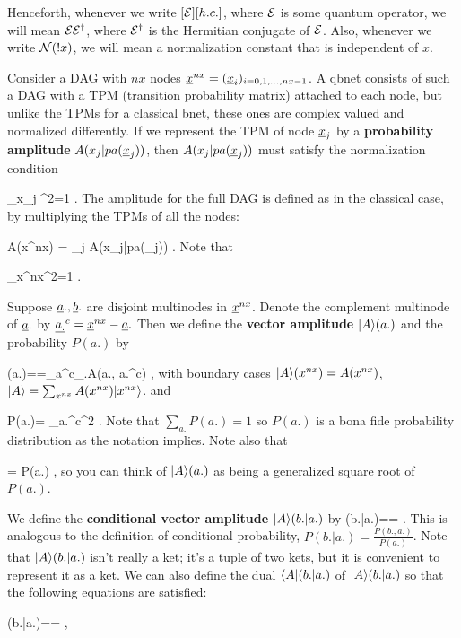 \documentclass[12pt]{article}
\begin{document}
Henceforth,
whenever
we write
$[{\cal E}][h.c.]$,
where ${\cal E}$
is some quantum operator,
we will mean ${\cal E}{\cal E}^\dag$,
where ${\cal E}^\dag$
is the Hermitian conjugate
of ${\cal E}$.
Also, whenever
we write
${\cal N}(!x)$,
we will
mean a 
normalization
constant that is independent
of $x$.

Consider
a DAG with $nx$ nodes
${\underline{x}}^{nx}= ({\underline{x}}_i)_{i=0, 1, \ldots, nx-1}$.
A qbnet 
consists of such a DAG with 
a TPM (transition probability matrix)
attached to each node,
but unlike the TPMs for a classical bnet,
these ones are complex valued
and normalized differently.
If we represent the TPM
of node ${\underline{x}}_j$
by a {\bf probability 
amplitude} $A(x_j|pa({\underline{x}}_j))$,
then $A(x_j|pa({\underline{x}}_j))$ must satisfy
the normalization condition

\beq
\sum_{x_j}
^2=1
\;.
\eeq
The amplitude for the full
DAG is defined as in the classical
case, by multiplying
the TPMs of all the nodes:

\beq
A(x^{nx})
=
\prod_j A(x_j|pa(\rvx_j))
\;.
\eeq
Note that

\beq
\sum_{x^{nx}}^2=1
\;.
\eeq

Suppose
${\underline{a}}., {\underline{b}}.$ are disjoint multinodes 
in ${\underline{x}}^{nx}$. Denote
the complement
multinode of ${\underline{a}}.$ by
$\underline{a_.}^c={\underline{x}}^{nx}-{\underline{a}}.$ Then
we define
the {\bf vector amplitude} $|A\rangle(a.)$ 
and the probability $P(a.)$ by


\beq 
\A(a.)==\sum_{a^c_.}A(a., a.^c)
\;,
\eeq
with boundary cases
$|A\rangle(x^{nx})=A(x^{nx})$,\;
$|A\rangle=\sum_{x^{nx}}A(x^{nx})|x^{nx}\rangle$.
and

\beq
P(a.)=
\sum_{a.^c}^2
\;.
\eeq
Note that $\sum_{a.} P(a.)=1$
so $P(a.)$ is a bona
fide probability
distribution as the notation implies. Note also that 

\beq
{}= P(a.)
\;, 
\eeq
so you
can think of $|A\rangle(a.)$
as being a generalized square root of $P(a.)$.



We define the {\bf conditional vector amplitude} $|A\rangle(b.|a.)$ by
\beq
\A(b.|a.)==
\;.
\eeq
This is analogous to the definition
of conditional
probability,
$P(b.|a.)=
\frac{P(b., a.)}{P(a.)}$.
Note that $|A\rangle(b.|a.)$
isn't really a ket; it's a tuple
of two kets, but it is convenient
to represent it as a ket.
We can also define the dual $\langle A|(b.|a.)$
of $|A\rangle(b.|a.)$ so that
the following equations are satisfied:

\beq
{}(b.|a.)==
\;,
\eeq
\end{document}
